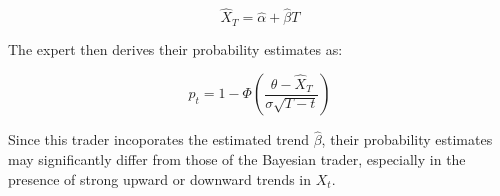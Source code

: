 \begin{equation}
    \hat{X}_T = \hat{\alpha} + \hat{\beta} T
\end{equation}

The expert then derives their probability estimates as:

\begin{equation}
    p_t = 1 - \Phi \left( \frac{\theta - \hat{X}_T}{\sigma \sqrt{T - t}} \right)
\end{equation}

Since this trader incoporates the estimated 
trend $\hat{\beta}$, their probability estimates may 
significantly differ from those of the Bayesian trader, 
especially in the presence of strong upward or downward trends in $X_t$.